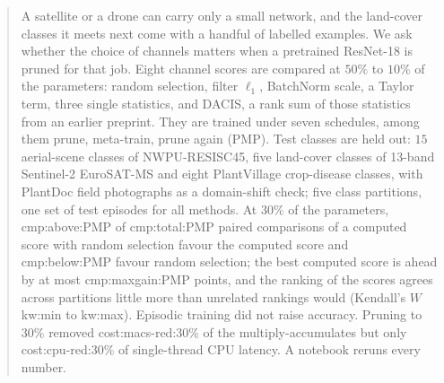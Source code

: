 \begin{abstract}
A satellite or a drone can carry only a small network, and the land-cover classes it meets next come with a handful of labelled examples. We ask whether the choice of channels matters when a pretrained ResNet-18 is pruned for that job. Eight channel scores are compared at $50\%$ to $10\%$ of the parameters: random selection, filter $\ell_1$, BatchNorm scale, a Taylor term, three single statistics, and DACIS, a rank sum of those statistics from an earlier preprint. They are trained under seven schedules, among them prune, meta-train, prune again (PMP). Test classes are held out: $15$ aerial-scene classes of NWPU-RESISC45, five land-cover classes of 13-band Sentinel-2 EuroSAT-MS and eight PlantVillage crop-disease classes, with PlantDoc field photographs as a domain-shift check; five class partitions, one set of test episodes for all methods. At $30\%$ of the parameters, \num{cmp:above:PMP} of \num{cmp:total:PMP} paired comparisons of a computed score with random selection favour the computed score and \num{cmp:below:PMP} favour random selection; the best computed score is ahead by at most \num{cmp:maxgain:PMP} points, and the ranking of the scores agrees across partitions little more than unrelated rankings would (Kendall's $W$ \num{kw:min} to \num{kw:max}). Episodic training did not raise accuracy. Pruning to $30\%$ removed \num{cost:macs-red:30}\% of the multiply-accumulates but only \num{cost:cpu-red:30}\% of single-thread CPU latency. A notebook reruns every number.
\end{abstract}
